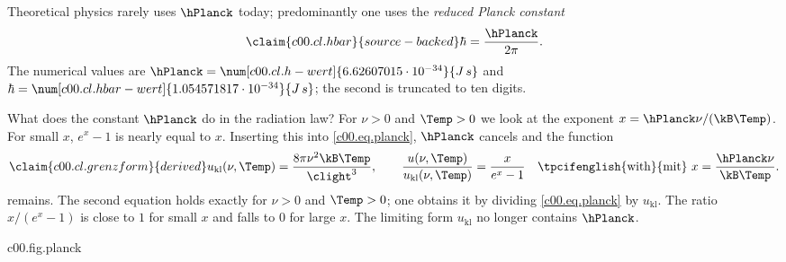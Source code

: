 Theoretical physics rarely uses $\hPlanck$ today; predominantly one uses the \emph{reduced
Planck constant}
\begin{equation}\label{c00.eq.hbar}\claim{c00.cl.hbar}{source-backed}
  \hbar = \frac{\hPlanck}{2\pi} .
\end{equation}
The numerical values are
$\hPlanck = \num[c00.cl.h-wert]{6.62607015 \cdot 10^{-34}}{J\,s}$ and
$\hbar = \num[c00.cl.hbar-wert]{1.054571817 \cdot 10^{-34}}{J\,s}$; the second is
truncated to ten digits.

What does the constant $\hPlanck$ do in the radiation law? For $\nu > 0$ and $\Temp > 0$ we
look at the exponent $x = \hPlanck\nu/(\kB \Temp)$. For small $x$, $e^x - 1$ is nearly equal
to $x$. Inserting this into \eqref{c00.eq.planck}, $\hPlanck$ cancels and the function
\begin{equation}\label{c00.eq.grenzform}\claim{c00.cl.grenzform}{derived}
  u_{\mathrm{kl}}(\nu, \Temp) = \frac{8\pi \nu^2 \kB \Temp}{\clight^3},
  \qquad
  \frac{u(\nu, \Temp)}{u_{\mathrm{kl}}(\nu, \Temp)} = \frac{x}{e^{x} - 1}
  \quad \text{\tpcifenglish{with}{mit}}\ x = \frac{\hPlanck\nu}{\kB \Temp} .
\end{equation}
remains. The second equation holds exactly for $\nu > 0$ and $\Temp > 0$; one obtains it by
dividing \eqref{c00.eq.planck} by $u_{\mathrm{kl}}$. The ratio $x/(e^x - 1)$ is close to $1$
for small $x$ and falls to $0$ for large $x$. The limiting form
$u_{\mathrm{kl}}$ no longer contains $\hPlanck$.

\begin{tpcfigure}{c00.fig.planck}
  \caption{The radiation law~\eqref{c00.eq.planck} and its limiting form
    \eqref{c00.eq.grenzform}. (a) The energy density $u$ for three temperatures $T_0$,
    $\tfrac56 T_0$ and $\tfrac23 T_0$ (solid, dashed, dash-dotted), plotted against
    $\hPlanck\nu/(\kB T_0)$ in units of $u_0 = 8\pi(\kB T_0)^3/(\hPlanck^2\clight^3)$. The
    thin dashed parabola is the limiting form $u_{\mathrm{kl}}$ for the highest temperature
    $T_0$. Notice how at small frequencies it lies approximately on the solid curve to which
    it belongs, and only then parts company with it; after that it runs off the top of the
    picture. (b) The ratio $u/u_{\mathrm{kl}} = x/(e^x-1)$ for $\nu > 0$ and $\Temp > 0$. It
    depends only on $x = \hPlanck\nu/(\kB\Temp)$. The hatched area is the distance from the
    limiting form. It becomes noticeable as soon as $\hPlanck\nu$ reaches the size of
    $\kB\Temp$.}
\end{tpcfigure}

